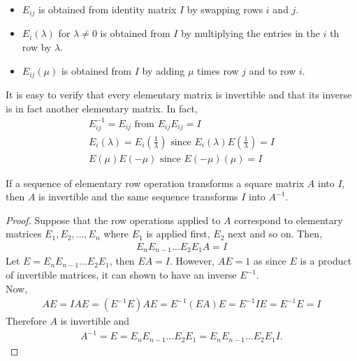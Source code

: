 \documentclass[a4paper]{article}
\theoremstyle{plain}
\newtheorem{thm}{Theorem}[section]
\theoremstyle{definition}
\theoremstyle{remark}
\begin{document}
\begin{itemize}
	\item $E_{ij}$ is obtained from identity matrix $I$ by swapping rows $i$ and $j$.
	\item $E_i(\lambda)$ for $\lambda \neq 0$ is obtained from $ I$ by multiplying the entries in the $i$ th row by $\lambda$.
	\item $E_{ij}(\mu)$ is obtained from $I$ by adding $\mu$ times row $j$ and to row $i$.
\end{itemize}
	It is easy to verify that every elementary matrix is invertible and that its inverse is in fact another elementary matrix. In fact,
	\begin{align*}
		E_{ij}^{-1} = E_{ij} \text{ from } E_{ij}E_{ij}=I \\
		E_i\left( \lambda \right) = E_i\left( \frac{1}{\lambda} \right) \text{ since } E_i\left( \lambda \right) E\left(\frac{1}{\lambda}\right) = I \\
		E(\mu)E(-\mu) \text{ since } E \left( -\mu \right)(\mu) = I
	\end{align*}
\begin{tcolorbox}[colback=black!3!white,colframe=black!60!white,title=\begin{thm}Sequences of elementary rows \label{Sequences of elementary rows}\end{thm}]
	If a sequence of elementary row operation transforms a square matrix $A$ into $I$, then $A$ is invertible and the same sequence transforms $I$ into $A^{-1}$.
	\begin{proof}
		Suppose that the row operations applied to $A$ correspond to elementary matrices $E_1, E_2, \ldots, E_n$ where $E_1$ is applied first, $E_2$ next and so on. Then,
		\begin{align*}
			E_nE_{n-1}\ldots E_2E_1A = I
		\end{align*}
		Let $E = E_n E_{n-1}\ldots E_2 E_1$, then $EA = I$. However, $AE = 1$ as since $E$ is a product of invertible matrices, it can shown to have an inverse $E^{-1}$. \\
		Now,
		\begin{align*}
			AE=IAE=(E^{-1}E)AE = E^{-1}(EA)E = E^{-1}IE=E^{-1}E = I
		\end{align*}
		Therefore $A$ is invertible and
		\begin{align*}
			A ^{-1} = E = E_n E_{n-1}\ldots E_2E_1 = E_n E_{n-1}\ldots E_2 E_1 I.
		\end{align*}
	\end{proof}
\end{tcolorbox}
\end{document}
